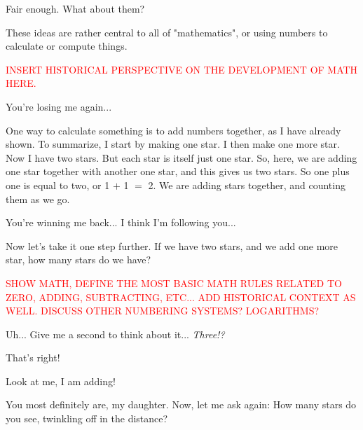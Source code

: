 \documentclass[main.tex]{subfiles}
\begin{document}
\par \Maia Fair enough.  What about them?

\par \Pleione These ideas are rather central to all of "mathematics", or using numbers to calculate or compute things.

\begin{tcolorbox}[sharp corners, colback=red!30, colframe=red!80!blue, title=History of Mathematics]
\par \textcolor{red} {INSERT HISTORICAL PERSPECTIVE ON THE DEVELOPMENT OF MATH HERE.}
\end{tcolorbox}

\par \Maia You're losing me again...

\par \Pleione One way to calculate something is to add numbers together, as I have already shown.  To summarize, I start by making one star.  I then make one more star.  Now I have two stars.  But each star is itself just one star.  So, here, we are adding one star together with another one star, and this gives us two stars.  So one plus one is equal to two, or 1 $+$ 1 $=$ 2.  We are adding stars together, and counting them as we go.

\par \Maia You're winning me back...  I think I'm following you...

\par \Pleione Now let's take it one step further.  If we have two stars, and we add one more star, how many stars do we have?

\begin{tcolorbox}[sharp corners, colback=red!30, colframe=red!80!blue, title=Mathematical Operations]
\par \textcolor{red} {SHOW MATH, DEFINE THE MOST BASIC MATH RULES RELATED TO ZERO, ADDING, SUBTRACTING, ETC...  ADD HISTORICAL CONTEXT AS WELL.  DISCUSS OTHER NUMBERING SYSTEMS?  LOGARITHMS? } 
\end{tcolorbox}
 
\par \Maia Uh... Give me a second to think about it... \textit{Three!?}

\par \Pleione That's right!  

\par \Maia Look at me, I am adding!

\par \Pleione You most definitely are, my daughter.  Now, let me ask again:  How many stars do you see, twinkling off in the distance?
\end{document}
